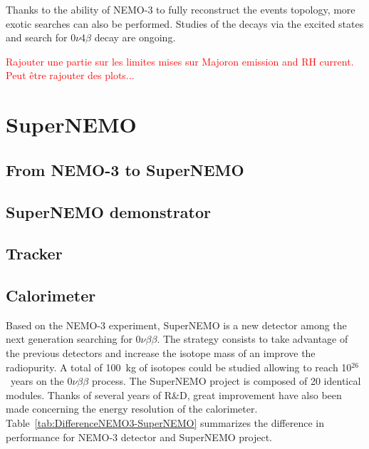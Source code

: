 \documentclass[main.tex]{subfiles}
\begin{document}
\NI Thanks to the ability of NEMO-3 to fully reconstruct the events topology, more exotic searches can also be performed. Studies of the decays via the excited states and search for 0$\nu$4$\beta$ decay are ongoing.

\bigskip


\NI \textcolor{red}{Rajouter une partie sur les limites mises sur Majoron emission and RH current. Peut être rajouter des plots...}


\FloatBarrier


\section{SuperNEMO}\label{sec:SuperNEMO}


\subsection{From NEMO-3 to SuperNEMO}


\subsection{SuperNEMO demonstrator}


\subsection{Tracker}


\subsection{Calorimeter}



\newpage



\NI Based on the NEMO-3 experiment, SuperNEMO is a new detector among the next generation searching for 0$\nu\beta\beta$. The strategy consists to take advantage of the previous detectors and increase the isotope mass of an improve the radiopurity. A total of 100~kg of isotopes could be studied allowing to reach 10$^{\text{26}}$~years on the 0$\nu\beta\beta$ process. The SuperNEMO project is composed of 20 identical modules. Thanks of several years of R\&D, great improvement have also been made concerning the energy resolution of the calorimeter. Table~\ref{tab:DifferenceNEMO3-SuperNEMO} summarizes the difference in performance for NEMO-3 detector and SuperNEMO project.
\end{document}
